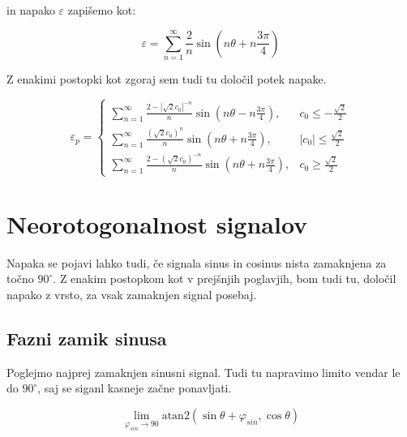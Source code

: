 
in napako $\varepsilon$ zapišemo kot:

\begin{equation}
\varepsilon = \sum_{n=1}^{\infty}\frac{2}{n} \sin (n \theta+ n \frac{3\pi}{4})
\end{equation}


Z enakimi postopki kot zgoraj sem tudi tu določil potek napake.


\begin{equation}
\label{vrsta_sincosoff}
\varepsilon_p=
\begin{cases}
\sum_{n=1}^{\infty}\frac{2-|\sqrt{2}c_0|^{-n}}{n} \sin (n \theta - n \frac{3\pi}{4}), & c_0\leq -\frac{\sqrt{2}}{2} \\
\sum_{n=1}^{\infty}\frac{(\sqrt{2}c_0)^n}{n} \sin (n \theta +  n \frac{3\pi}{4}), & |c_0|\leq \frac{\sqrt{2}}{2} \\
\sum_{n=1}^{\infty}\frac{2-(\sqrt{2}c_0)^{-n}}{n} \sin (n \theta +  n \frac{3\pi}{4}), & c_0\geq \frac{\sqrt{2}}{2}
\end{cases}
\end{equation}





\section{Neorotogonalnost signalov}

Napaka se pojavi lahko tudi, če signala sinus in cosinus nista zamaknjena za točno $90^\circ$. Z enakim postopkom kot v prejšnjih poglavjih, bom tudi tu, določil napako z vrsto, za vsak zamaknjen signal posebaj.

\subsection{Fazni zamik sinusa}

Poglejmo najprej zamaknjen sinusni signal. Tudi tu napravimo limito vendar le do $90^\circ$, saj se siganl kasneje začne ponavljati.



\begin{equation}
\lim_{\varphi_{sin} \rightarrow 90} \mathrm{atan2}(\sin{\theta+\varphi_{sin}} ,\cos{\theta}) 
\end{equation}


